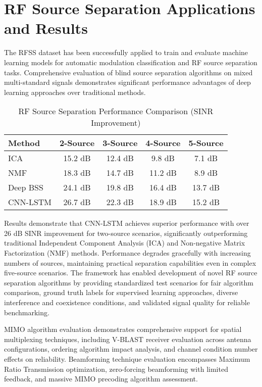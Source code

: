 \documentclass[twocolumn,10pt]{article}
\begin{document}
\section{RF Source Separation Applications and Results}

The RFSS dataset has been successfully applied to train and evaluate machine learning models for automatic modulation classification and RF source separation tasks. Comprehensive evaluation of blind source separation algorithms on mixed multi-standard signals demonstrates significant performance advantages of deep learning approaches over traditional methods.

\begin{table}[h!]
\caption{RF Source Separation Performance Comparison (SINR Improvement)}
\label{tab:separation_results}
\centering
\begin{tabular}{|l|c|c|c|c|}
\hline
\textbf{Method} & \textbf{2-Source} & \textbf{3-Source} & \textbf{4-Source} & \textbf{5-Source} \\
\hline
ICA & 15.2 dB & 12.4 dB & 9.8 dB & 7.1 dB \\
NMF & 18.3 dB & 14.7 dB & 11.2 dB & 8.9 dB \\
Deep BSS & 24.1 dB & 19.8 dB & 16.4 dB & 13.7 dB \\
CNN-LSTM & 26.7 dB & 22.3 dB & 18.9 dB & 15.2 dB \\
\hline
\end{tabular}
\end{table}

Results demonstrate that CNN-LSTM achieves superior performance with over 26 dB SINR improvement for two-source scenarios, significantly outperforming traditional Independent Component Analysis (ICA) and Non-negative Matrix Factorization (NMF) methods. Performance degrades gracefully with increasing numbers of sources, maintaining practical separation capabilities even in complex five-source scenarios. The framework has enabled development of novel RF source separation algorithms by providing standardized test scenarios for fair algorithm comparison, ground truth labels for supervised learning approaches, diverse interference and coexistence conditions, and validated signal quality for reliable benchmarking.

MIMO algorithm evaluation demonstrates comprehensive support for spatial multiplexing techniques, including V-BLAST receiver evaluation across antenna configurations, ordering algorithm impact analysis, and channel condition number effects on reliability. Beamforming technique evaluation encompasses Maximum Ratio Transmission optimization, zero-forcing beamforming with limited feedback, and massive MIMO precoding algorithm assessment.
\end{document}
